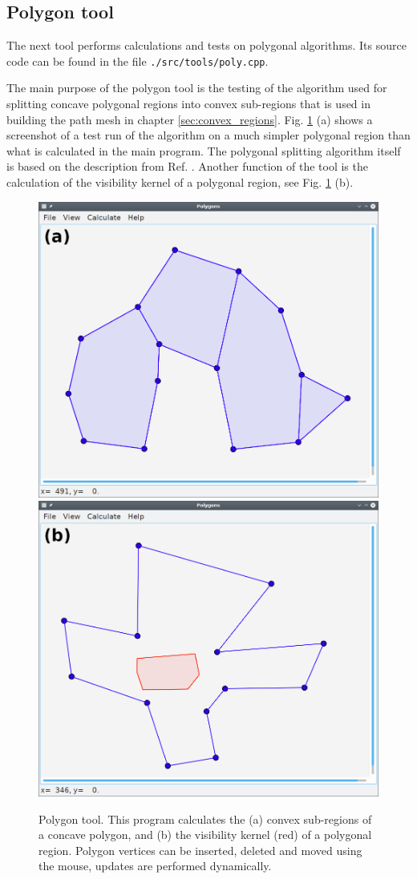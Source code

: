 \subsection{Polygon tool}
The next tool performs calculations and tests on polygonal algorithms. 
Its source code can be found in the file \lstinline|./src/tools/poly.cpp|.

The main purpose of the polygon tool is the testing of the algorithm used for splitting concave 
polygonal regions into convex sub-regions that is used in building the path mesh in chapter \ref{sec:convex_regions}. 
Fig. \ref{fig:polygui} (a) shows a screenshot of a test run of the algorithm on a much simpler
polygonal region than what is calculated in the main program. The polygonal splitting algorithm 
itself is based on the description from Ref. \cite{Hegazy2014}.
Another function of the tool is the calculation of the visibility kernel \cite[Ch. 3.3, p. 141]{FUH_geo2020} of a
polygonal region, see Fig. \ref{fig:polygui} (b).


\begin{figure}[h]
	\centering
	\includegraphics[width = 0.49 \textwidth]{figures/polygui_convex}
	\hspace{0.05cm}
	\includegraphics[width = 0.49 \textwidth]{figures/polygui_kernel}
	\caption[Polygon tool.]{Polygon tool.
		This program calculates the
		(a) convex sub-regions of a concave polygon, and
		(b) the visibility kernel (red) of a polygonal region.
		Polygon vertices can be inserted, deleted and moved using the mouse, updates
		are performed dynamically.
		\label{fig:polygui}}
\end{figure}



